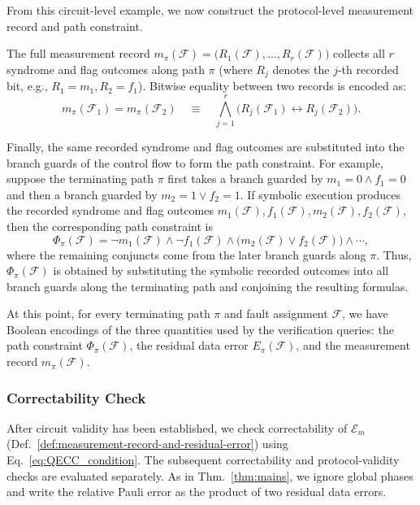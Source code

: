 \documentclass[acmsmall,screen,review,anonymous,nonacm]{acmart}
\begin{document}
\noindent From this circuit-level example, we now construct the protocol-level measurement record and path constraint.

The full measurement record $m_\pi(\mathcal{F}) = \bigl(R_1(\mathcal{F}), \ldots, R_r(\mathcal{F})\bigr)$ collects all $r$ syndrome and flag outcomes along path $\pi$ (where $R_j$ denotes the $j$-th recorded bit, e.g., $R_1 = m_1, R_2 = f_1$). Bitwise equality between two records is encoded as:
\[
m_\pi(\mathcal{F}_1) = m_\pi(\mathcal{F}_2) \quad\equiv\quad \bigwedge_{j=1}^r \bigl(R_j(\mathcal{F}_1)\leftrightarrow R_j(\mathcal{F}_2)\bigr).
\]

Finally, the same recorded syndrome and flag outcomes are substituted into the
branch guards of the control flow to form the path constraint. For example,
suppose the terminating path $\pi$ first takes a branch guarded by
$m_1=0\land f_1=0$ and then a branch guarded by $m_2=1\lor f_2=1$. If symbolic
execution produces the recorded syndrome and flag outcomes
$m_1(\mathcal{F}),f_1(\mathcal{F}),m_2(\mathcal{F}),f_2(\mathcal{F})$, then the corresponding path constraint is
\[
\Phi_\pi(\mathcal{F})
=
\neg m_1(\mathcal{F})
\land
\neg f_1(\mathcal{F})
\land
\bigl(m_2(\mathcal{F})\lor f_2(\mathcal{F})\bigr)
\land \cdots ,
\]
where the remaining conjuncts come from the later branch guards along $\pi$.
Thus, $\Phi_\pi(\mathcal{F})$ is obtained by substituting the symbolic recorded outcomes
into all branch guards along the terminating path and conjoining the resulting
formulas.

At this point, for every terminating path $\pi$ and fault assignment $\mathcal{F}$, we
have Boolean encodings of the three quantities used by the verification
queries: the path constraint $\Phi_\pi(\mathcal{F})$, the residual data error
$E_\pi(\mathcal{F})$, and the measurement record $m_\pi(\mathcal{F})$.

\subsubsection{Correctability Check}
\label{subsec:ftec-check}

After circuit validity has been established, we check correctability
of $\mathcal E_m$ (Def.~\ref{def:measurement-record-and-residual-error})
using Eq.~\ref{eq:QECC_condition}. The subsequent correctability and
protocol-validity checks are evaluated separately.
As in Thm.~\ref{thm:mains}, we ignore global phases and write the
relative Pauli error as the product of two residual data errors.
\end{document}

